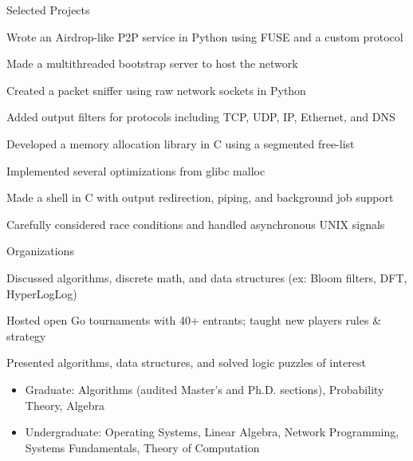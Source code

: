 \documentclass{cv}
\begin{document}
\begin{cvsection}{Selected Projects}
  {
    \item Wrote an Airdrop-like P2P service in Python using FUSE and a custom protocol
    \item Made a multithreaded bootstrap server to host the network
  }
  {
    \item Created a packet sniffer using raw network sockets in Python
    \item Added output filters for protocols including TCP, UDP, IP, Ethernet, and DNS
  }
  {
    \item Developed a memory allocation library in C using a segmented free-list
    \item Implemented several optimizations from glibc malloc
  }
  {
    \item Made a shell in C with output redirection, piping, and background job support
    \item Carefully considered race conditions and handled asynchronous UNIX signals
  }
\end{cvsection}

\begin{cvsection}{Organizations}
  {
    \item Discussed algorithms, discrete math, and data structures (ex: Bloom filters, DFT, HyperLogLog)
  }
  {
    \item Hosted open Go tournaments with 40+ entrants; taught new players rules \& strategy
  }
  {
    \item Presented algorithms, data structures, and solved logic puzzles of interest
  }
\end{cvsection}

\begin{minipage}{\textwidth}
  \begin{itemize}[noitemsep,topsep=0pt]%
    \item Graduate: Algorithms (audited Master's and Ph.D. sections), Probability Theory, Algebra
    \item Undergraduate: Operating Systems, Linear Algebra, Network Programming, Systems Fundamentals, Theory of Computation
  \end{itemize}%
\end{minipage}%
\end{document}
